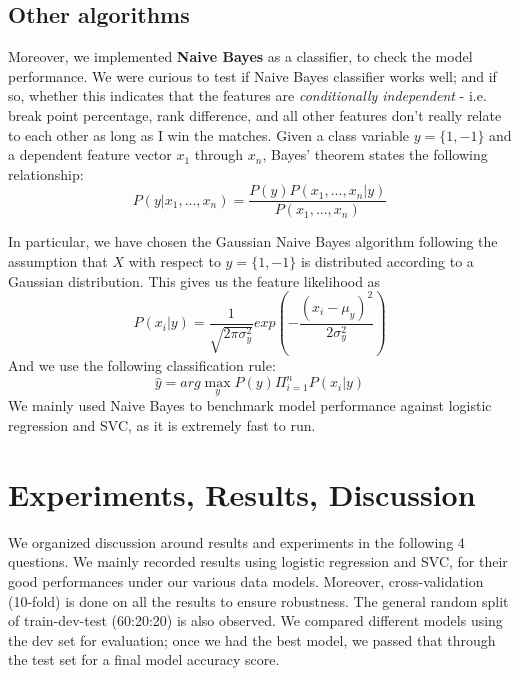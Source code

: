 \documentclass[paper=a4, fontsize=10pt]{scrartcl} %
\numberwithin{equation}{section} %
\numberwithin{figure}{section} %
\numberwithin{table}{section} %
\begin{document}
\subsection{Other algorithms}
Moreover, we implemented \textbf{Naive Bayes} as a classifier, to check the model performance. We were curious to test if Naive Bayes classifier works well; and if so, whether this indicates that the features are \textit{conditionally independent} - i.e. break point percentage, rank difference, and all other features don't really relate to each other as long as I win the matches. Given a class variable $y = \{1,-1\}$  and a dependent feature vector $x_1$ through $x_n$, Bayes’ theorem states the following relationship: $$P(y|x_1,...,x_n) = \frac{P(y)P(x_1,...,x_n|y)}{P(x_1,...,x_n)}$$

In particular, we have chosen the Gaussian Naive Bayes algorithm following the assumption that $X$ with respect to $y = \{1,-1\}$ is distributed according to a Gaussian distribution. This gives us the feature likelihood as $$P(x_i | y) = \frac{1}{\sqrt{2\pi \sigma_y^2}} exp(-\frac{(x_i - \mu_y)^2}{2\sigma_y^2})$$
And we use the following classification rule:
$$\hat{y} = arg \max_y P(y) \Pi_{i=1}^n P(x_i | y)$$
We mainly used Naive Bayes to benchmark model performance against logistic regression and SVC, as it is extremely fast to run.


\section{Experiments, Results, Discussion}
We organized discussion around results and experiments in the following 4 questions. We mainly recorded results using logistic regression and SVC, for their good performances under our various data models. Moreover, cross-validation (10-fold) is done on all the results to ensure robustness. The general random split of train-dev-test (60:20:20) is also observed. We compared different models using the dev set for evaluation; once we had the best model, we passed that through the test set for a final model accuracy score. 
\end{document}
